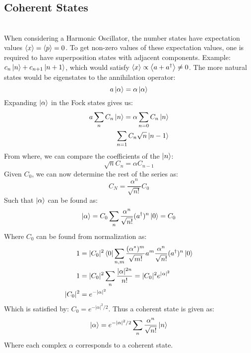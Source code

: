 \subsection{Coherent States}
 \\ \noindent
When considering a Harmonic Oscillator, the number states have expectation values $\expval{x} = \expval{p} = 0$. To get non-zero values of these expectation values, one is required to have superposition states with adjacent components. Example: $c_n\ket{n} + c_{n+1} \ket{n+1}$, which would satisfy $\expval{x} \propto \expval{a + a^\dagger} \neq 0$. The more natural states would be eigenstates to the annihilation operator:
\begin{equation}
    a \ket{\alpha} = \alpha \ket{\alpha}
\end{equation}
Expanding $\ket{\alpha}$ in the Fock states gives us:
\begin{align}
    a \sum_n C_n \ket{n} = \alpha \sum_{n = 0} C_n \ket{n} \\
    \sum_{n = 1} C_n \sqrt{n} \ket{n - 1}
\end{align}
From where, we can compare the coefficients of the $\ket{n}$:
\begin{equation}
    \sqrt{n} C_n = \alpha C_{n - 1}
\end{equation}
Given $C_0$, we can now determine the rest of the series as:
\begin{equation}
    C_N = \frac{\alpha^n}{\sqrt{n!}} C_0 
\end{equation}
Such that $\ket{\alpha}$ can be found as: 
\begin{equation}
    \ket{\alpha} = C_0 \sum_n \frac{\alpha^n} {\sqrt{n!}} (a^\dagger)^n \ket{0} = C_0
\end{equation}
Where $C_0$ can be found from normalization as:
\begin{align}
    1 &= |C_0|^2 \bra{0}\sum_{n, m}\frac{(\alpha^*)^m} {\sqrt{m!}} a^m \frac{\alpha^n} {\sqrt{n!}} (a^\dagger)^n \ket{0} \\
    1 &= |C_0|^2 \sum_n \frac{|\alpha|^{2n} }{n!} = |C_0|^2 e^{|\alpha|^2} \\
    |C_0|^2 &= e^{-|\alpha|^2}
\end{align}
Which is satisfied by: $C_0 = e^{- |\alpha|^2 / 2}$. Thus a coherent state is given as:
\begin{equation}
    \ket{\alpha} = e^{-|\alpha|^2 / 2} \sum_n \frac{\alpha^n}{\sqrt{n!}} \ket{n}
\end{equation}
Where each complex $\alpha$ corresponds to a coherent state.

